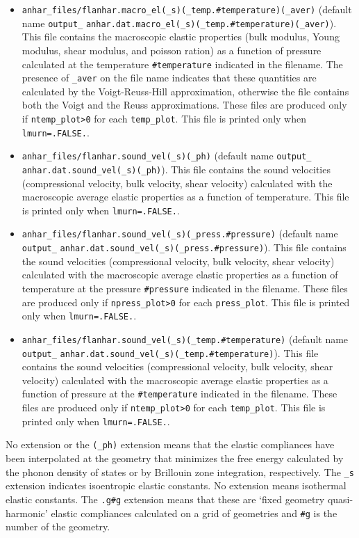 \documentclass[12pt,a4paper,twoside]{report}
\begin{document}
\begin{itemize}
\item
\texttt{anhar\_files/flanhar.macro\_el(\_s)(\_temp.\#temperature)(\_aver)}
(default name \texttt{output\_} 
\texttt{anhar.dat.macro\_el(\_s)(\_temp.\#temperature)(\_aver)}). 
This file contains the macroscopic elastic properties (bulk modulus,
Young modulus, shear modulus, and poisson ration) as a function of 
pressure calculated at the temperature \texttt{\#temperature} indicated
in the filename.
The presence of \texttt{\_aver} on the file name indicates that these
quantities are calculated by the Voigt-Reuss-Hill approximation, otherwise
the file contains both the Voigt and the Reuss approximations.
These files are produced only if \texttt{ntemp\_plot>0} for each
\texttt{temp\_plot}.
This file is printed only when \texttt{lmurn=.FALSE.}.

\item
\texttt{anhar\_files/flanhar.sound\_vel(\_s)(\_ph)}
(default name \texttt{output\_} \\
\texttt{anhar.dat.sound\_vel(\_s)(\_ph)}). 
This file contains the sound velocities (compressional velocity,
bulk velocity, shear velocity) calculated with the macroscopic
average elastic properties as a function of temperature.
This file is printed only when \texttt{lmurn=.FALSE.}.

\item
\texttt{anhar\_files/flanhar.sound\_vel(\_s)(\_press.\#pressure)}
(default name \texttt{output\_} 
\texttt{anhar.dat.sound\_vel(\_s)(\_press.\#pressure)}). 
This file contains the sound velocities (compressional velocity,
bulk velocity, shear velocity) calculated with the macroscopic
average elastic properties as a function of temperature at the 
pressure \texttt{\#pressure} indicated in the filename.
These files are produced only if \texttt{npress\_plot>0} for each
\texttt{press\_plot}.
This file is printed only when \texttt{lmurn=.FALSE.}.

\item
\texttt{anhar\_files/flanhar.sound\_vel(\_s)(\_temp.\#temperature)}
(default name \texttt{output\_} 
\texttt{anhar.dat.sound\_vel(\_s)(\_temp.\#temperature)}). 
This file contains the sound velocities (compressional velocity,
bulk velocity, shear velocity) calculated with the macroscopic
average elastic properties as a function of pressure at the 
\texttt{\#temperature} indicated in the filename.
These files are produced only if \texttt{ntemp\_plot>0} for each
\texttt{temp\_plot}.
This file is printed only when \texttt{lmurn=.FALSE.}.


\end{itemize}
No extension or the \texttt{(\_ph)} extension means that the elastic
compliances have been interpolated at the geometry that minimizes the
free energy calculated by the phonon density of states or by Brillouin
zone integration, respectively. 
The \texttt{\_s} extension indicates isoentropic elastic constants.
No extension means isothermal elastic constants.
The \texttt{.g\#g} extension means that these are `fixed geometry
quasi-harmonic' elastic compliances calculated on a grid of geometries
and \texttt{\#g} is the number of the geometry.
\end{document}
